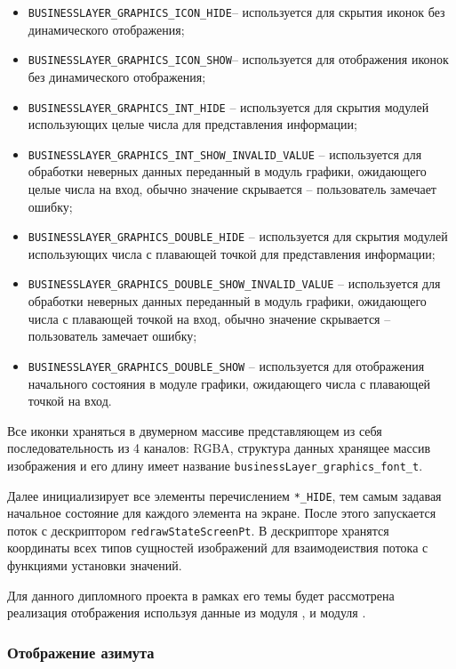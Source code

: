 \begin{itemize}
    \item \lstinline{BUSINESSLAYER_GRAPHICS_ICON_HIDE}-- используется для скрытия иконок без динамического отображения;
    \item \lstinline{BUSINESSLAYER_GRAPHICS_ICON_SHOW}-- используется для отображения иконок без динамического отображения;
    \item \lstinline{BUSINESSLAYER_GRAPHICS_INT_HIDE} -- используется для скрытия модулей использующих целые числа для представления информации;
    \item \lstinline{BUSINESSLAYER_GRAPHICS_INT_SHOW_INVALID_VALUE} -- используется для обработки неверных данных переданный в модуль графики, ожидающего целые числа на вход, обычно значение скрывается -- пользователь замечает ошибку;
    \item \lstinline{BUSINESSLAYER_GRAPHICS_DOUBLE_HIDE} -- используется для скрытия модулей использующих числа с плавающей точкой для представления информации;
    \item \lstinline{BUSINESSLAYER_GRAPHICS_DOUBLE_SHOW_INVALID_VALUE} -- используется для обработки неверных данных переданный в модуль графики, ожидающего числа с плавающей точкой на вход, обычно значение скрывается -- пользователь замечает ошибку;
    \item \lstinline{BUSINESSLAYER_GRAPHICS_DOUBLE_SHOW} -- используется для отображения начального состояния в модуле графики, ожидающего числа с плавающей точкой на вход.
\end{itemize}

Все иконки храняться в двумерном массиве представляющем из себя последовательность из 4 каналов: RGBA, структура данных хранящее массив изображения и его длину имеет название \lstinline{businessLayer_graphics_font_t}.

Далее инициализирует все элементы перечислением \lstinline{*_HIDE}, тем самым задавая начальное состояние для каждого элемента на экране.
После этого запускается поток с дескриптором \lstinline{redrawStateScreenPt}. В дескрипторе хранятся координаты всех типов сущностей изображений для взаимодеиствия потока
с функциями установки значений.

Для данного дипломного проекта в рамках его темы будет рассмотрена реализация отображения используя данные из модуля \moduleOrientationAzimuth, и модуля \moduleFindTarget .

\subsubsection{Отображение азимута}

